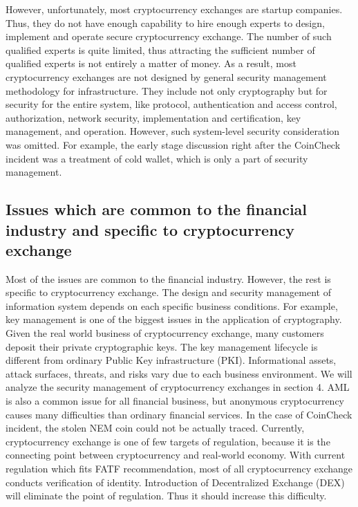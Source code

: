 However, unfortunately, most cryptocurrency exchanges are startup companies. Thus, they do not have enough
capability to hire enough experts to design, implement and operate secure cryptocurrency exchange. The number of
such qualified experts is quite limited, thus attracting the sufficient number of qualified experts is not entirely a matter of money.
As a result, most cryptocurrency exchanges are not designed by general security management methodology for infrastructure.
They include not only cryptography but for security for the entire system, like protocol, authentication and access control, authorization,
network security, implementation and certification, key management, and operation.
However, such system-level security consideration was omitted.
For example, the early stage discussion right after the CoinCheck incident was a treatment of cold wallet, which is only a part of security management.

\subsection{Issues which are common to the financial industry and specific to cryptocurrency exchange}

Most of the issues
are common to the financial industry. However, the rest is specific to cryptocurrency exchange.
The design and security management of
information system depends on each specific business conditions. For example, key management is
one of the biggest issues in the application of cryptography. Given the real world business of cryptocurrency
exchange, many customers deposit their private cryptographic keys. The key management lifecycle is different
from ordinary Public Key infrastructure (PKI).
Informational assets, attack surfaces, threats, and risks
vary due to each business environment. We will analyze the security management of
cryptocurrency exchanges in section 4.
AML is also a common issue for all financial business, but anonymous cryptocurrency causes
many difficulties than ordinary financial services. In the case of CoinCheck incident,
the stolen NEM coin could not be actually traced. Currently, cryptocurrency exchange is one of few targets of regulation, because it is the connecting point between cryptocurrency and real-world economy. With current regulation which fits FATF recommendation, most of all cryptocurrency exchange conducts verification of identity. Introduction of Decentralized Exchange (DEX) will eliminate the point of regulation. Thus it
should increase this difficulty.

